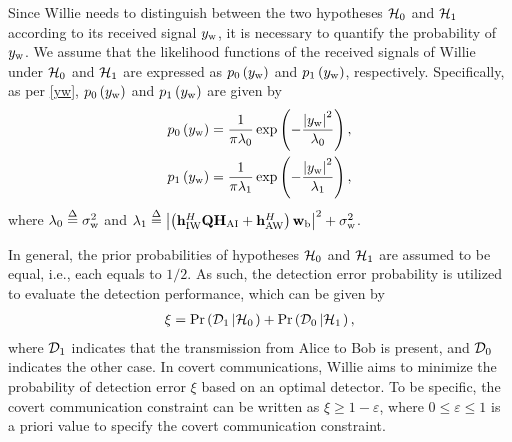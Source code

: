 \documentclass[10pt,journal,letterpaper,twocolumn,twoside]{IEEEtran} %
\begin{document}
Since Willie needs to distinguish between  the two hypotheses ${{\cal H} _0}$ and ${{\cal H} _1}$ according to its received signal ${y_{{\rm{w}}}}$, it is necessary to quantify the probability of ${y_{{\rm{w}}}}$.
We assume that the likelihood functions of the received signals of Willie under ${{{\cal H}_{\rm{0}}}}$ and ${{{\cal H}_{\rm{1}}}}$ are expressed as ${p_0}\left( {{y_{\rm{w}}}} \right)$
 and ${p_1}\left( {{y_{\rm{w}}}} \right)$, respectively.
 Specifically, as per \eqref{yw}, ${p_0}\left( {{y_{\rm{w}}}} \right)$ and ${p_1}\left( {{y_{\rm{w}}}} \right)$ are given  by
\begin{subequations}\label{C_8}
\begin{align}
& {p_0}\left( {{y_{\rm{w}}}} \right) = \frac{1}{{\pi {\lambda _0}}}\exp \left( { - \frac{{{{\left| {{y_{\rm{w}}}} \right|}^2}}}{{{\lambda _0}}}} \right), \\
 &{p_1}\left( {{y_{\rm{w}}}} \right) = \frac{1}{{\pi {\lambda _1}}}\exp \left( { - \frac{{{{\left| {{y_{\rm{w}}}} \right|}^2}}}{{{\lambda _1}}}} \right),
\end{align}
  \end{subequations}
where ${\lambda _0} \buildrel \Delta \over = \sigma _{\rm{w}}^2$ and ${\lambda_1} \buildrel \Delta \over =
{\left| {\left( {{\bf{h}}_{{\rm{IW}}}^H{\bf{Q}}{{\bf{H}}_{{\rm{AI}}}} + {\bf{h}}_{{\rm{AW}}}^H} \right){{\bf{w}}_{\rm{b}}}} \right|^{\rm{2}}}+ \sigma _{\rm{w}}^2$.


In general,    the prior
probabilities of   hypotheses ${{{\cal H}_0}}$ and ${{{\cal H}_1}}$  are assumed to be equal, i.e., each equals to  $1/2$.
As such, the detection error probability is utilized to evaluate the detection performance, which can be given by \cite{Yan2019Gaussian,Cover_2003_Elements,Lehmann_2005_Testing}
\begin{align}\label{xi}
\xi  = \Pr \left( {{{\cal D}_1}\left| {{{\cal H}_0}} \right.} \right) + \Pr \left( {{{\cal D}_0}\left| {{{\cal H}_1}} \right.} \right) ,
\end{align}
where   ${{\cal D}_1}$ indicates  that the transmission from Alice to Bob is present, and  ${{\cal D}_0}$ indicates the other case.
In covert communications, Willie aims to minimize the probability of detection error $ {\xi } $ based on an optimal detector.
To be specific, the covert communication constraint
 can be written as  $ \xi  \ge 1 - \varepsilon $, where
$0 \le \varepsilon  \le 1$
is a priori value to specify the covert
communication constraint.
\end{document}
